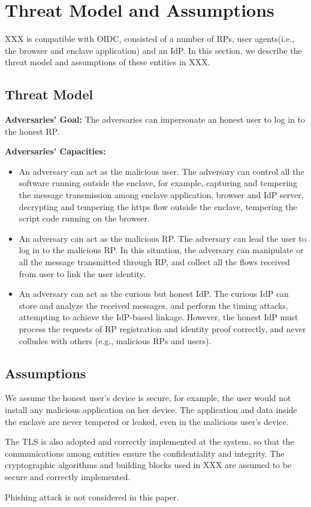 \section{Threat Model and Assumptions}
XXX is compatible with OIDC, consisted of a number of RPs, user agents(i.e., the browser and enclave application) and an IdP. In this section, we describe the threat model and assumptions of these entities in XXX.
\subsection{Threat Model}
\noindent\textbf{Adversaries' Goal: }The adversaries can impersonate an honest user to log in to the honest RP. 

\noindent\textbf{Adversaries' Capacities: }
\begin{itemize}
\item An adversary can act as the malicious user. The adversary can control all the software running outside the enclave, for example, capturing and tempering the message transmission among enclave application, browser and IdP server, decrypting and tempering the https flow outside the enclave, tempering the script code running on the browser.
\item An adversary can act as the malicious RP. The adversary can lead the user to log in to the malicious RP. In this situation, the adversary can manipulate or all the message transmitted through RP, and collect all the flows received from user to link the user identity.
\item An adversary can act as the curious but honest IdP. The curious IdP can store and analyze the received messages, and perform the timing attacks, attempting to achieve the IdP-based linkage. However, the honest IdP must process the requests of RP registration and identity proof correctly, and never colludes with others (e.g., malicious RPs and users).
\end{itemize}

\subsection{Assumptions}
We assume the honest user's device is secure, for example, the user would not install any malicious application on her device. The application and data inside the enclave are never tempered or leaked, even in the malicious user's device.

The TLS is also adopted and correctly implemented at the system, so that the communications among entities ensure the confidentiality and integrity.
The cryptographic algorithms and building blocks used in XXX are assumed to be secure and correctly implemented. 

Phishing attack is not considered in this paper.

